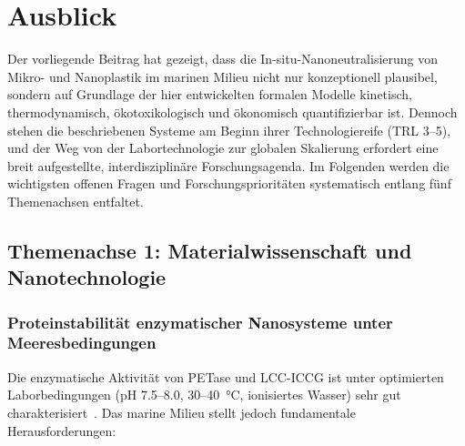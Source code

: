 ﻿\documentclass[12pt,a4paper]{article}
\theoremstyle{definition}
\theoremstyle{remark}
\begin{document}
\section{Ausblick}
\label{sec:ausblick}

Der vorliegende Beitrag hat gezeigt, dass die In-situ-Nanoneutralisierung von
Mikro- und Nanoplastik im marinen Milieu nicht nur konzeptionell plausibel,
sondern auf Grundlage der hier entwickelten formalen Modelle
kinetisch, thermodynamisch, ökotoxikologisch und ökonomisch quantifizierbar ist.
Dennoch stehen die beschriebenen Systeme am Beginn ihrer Technologiereife
(TRL 3--5), und der Weg von der Labortechnologie zur globalen Skalierung
erfordert eine breit aufgestellte, interdisziplinäre Forschungsagenda.
Im Folgenden werden die wichtigsten offenen Fragen und Forschungsprioritäten
systematisch entlang fünf Themenachsen entfaltet.

\subsection{Themenachse 1: Materialwissenschaft und Nanotechnologie}

\subsubsection{Proteinstabilität enzymatischer Nanosysteme unter Meeresbedingungen}

Die enzymatische Aktivität von PETase und LCC-ICCG ist unter optimierten
Laborbedingungen (pH 7.5--8.0, 30--40\, °C, ionisiertes Wasser) sehr gut
charakterisiert~\cite{tournier2020engineered}. Das marine Milieu stellt
jedoch fundamentale Herausforderungen:
\end{document}
